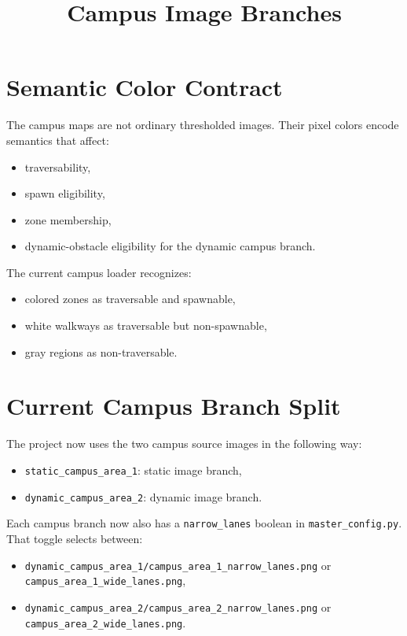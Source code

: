 \documentclass[11pt]{article}
\title{Campus Image Branches}
\author{}
\date{}
\begin{document}
\maketitle

\section{Semantic Color Contract}

The campus maps are not ordinary thresholded images. Their pixel colors encode semantics that affect:
\begin{itemize}[leftmargin=2em]
    \item traversability,
    \item spawn eligibility,
    \item zone membership,
    \item dynamic-obstacle eligibility for the dynamic campus branch.
\end{itemize}

The current campus loader recognizes:
\begin{itemize}[leftmargin=2em]
    \item colored zones as traversable and spawnable,
    \item white walkways as traversable but non-spawnable,
    \item gray regions as non-traversable.
\end{itemize}

\section{Current Campus Branch Split}

The project now uses the two campus source images in the following way:
\begin{itemize}[leftmargin=2em]
    \item \texttt{static\_campus\_area\_1}: static image branch,
    \item \texttt{dynamic\_campus\_area\_2}: dynamic image branch.
\end{itemize}

Each campus branch now also has a \texttt{narrow\_lanes} boolean in \texttt{master\_config.py}. That toggle selects between:
\begin{itemize}[leftmargin=2em]
    \item \texttt{dynamic\_campus\_area\_1/campus\_area\_1\_narrow\_lanes.png} or \texttt{campus\_area\_1\_wide\_lanes.png},
    \item \texttt{dynamic\_campus\_area\_2/campus\_area\_2\_narrow\_lanes.png} or \texttt{campus\_area\_2\_wide\_lanes.png}.
\end{itemize}
\end{document}
